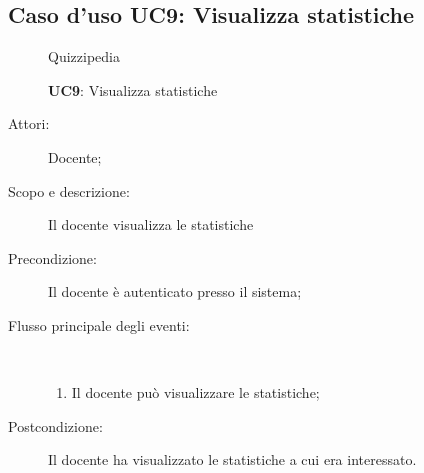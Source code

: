 \subsection{Caso d'uso UC9: Visualizza statistiche}
	\begin{figure}[H]
		\centering
		\begin{resizedtikzpicture}{\textwidth}
		\begin{umlsystem}[x=0, fill=lightgray!20]{Quizzipedia}
		\end{umlsystem}
		\end{resizedtikzpicture}
		\caption{\textbf{UC9}: Visualizza statistiche}
		\label{UC9}
	\end{figure}
\begin{description}
\item[Attori:] Docente;
\item[Scopo e descrizione:] Il docente visualizza le statistiche
      \item[Precondizione:] Il docente è autenticato presso il sistema;

        \item[Flusso principale degli eventi:] \ 
 \begin{enumerate}
          \item Il docente può visualizzare le statistiche;

      \end{enumerate}
    \item[Postcondizione:] Il docente ha visualizzato le statistiche a cui era interessato.
  \end{description}
\hypertarget{UC10}{}
